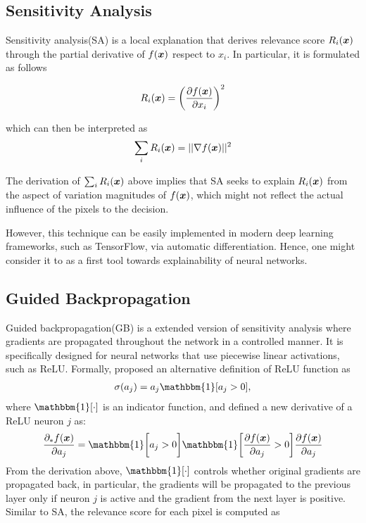 \subsection{Sensitivity Analysis}
Sensitivity analysis(SA)\cite{SimonyanDeepConvolutionalNetworks2013} is a local explanation that derives relevance score $R_i(\boldsymbol{x})$ through the  partial derivative of $f(\patvector{x})$ respect to $x_i$. In particular, it is formulated as follows 

\begin{align}
	R_i(\x) =
	 \bigg( \frac{\partial f(\patvector{x})}{ \partial x_i } \bigg)^2
\end{align}

which can then be interpreted as
\begin{align}
	\sum_i R_i(\x) = || \nabla f(\patvector{x}) ||^2
\end{align}

The derivation of $\sum_i R_i(\boldsymbol{x})$ above implies that SA seeks to explain $R_i(\boldsymbol{x})$ from the aspect of variation magnitudes of $f(\boldsymbol{x})$, which might not reflect the actual influence of the pixels to the decision.

However, this technique can be easily implemented in modern deep learning frameworks, such as TensorFlow\cite{AbadiTensorFlowLargeScaleMachine2016}, via automatic differentiation. Hence, one might consider it to as a first tool towards explainability of neural networks.

\subsection{Guided Backpropagation}
Guided backpropagation(GB) is a extended version of sensitivity analysis where gradients are propagated throughout the network in a controlled manner. It is specifically designed for neural networks that use piecewise linear activations, such as ReLU. Formally, \cite{SpringenbergStrivingSimplicityAll2014e} proposed an alternative definition  of ReLU function as
\begin{align}
	\sigma(a_j) = a_j \mathbbm{1}[ a_j > 0 ],
\end{align}
where $\mathbbm{1}[ \cdot ]$  is an indicator function, and defined a new derivative of a ReLU neuron $j$ as:
\begin{align}
	\frac{\partial_* f(\patvector{x}) }{ \partial a_j } = \mathbbm{1}\bigg[a_j > 0 \bigg] \mathbbm{1}\bigg[ \frac{ \partial f(\patvector{x}) }{ \partial a_j } > 0 \bigg] \frac{ \partial f(\patvector{x}) }{ \partial a_j } 
\end{align}
From the derivation above, $\mathbbm{1}[ \cdot ]$ controls whether original gradients are propagated back, in particular, the gradients will be propagated to the previous layer only if neuron $j$ is active and the gradient from the next layer is positive. Similar to SA, the relevance score for each pixel is computed as 

